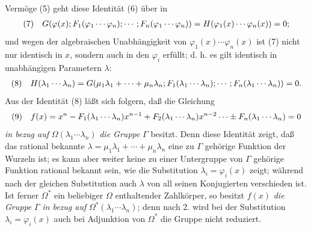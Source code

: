 Vermöge (5) geht diese Identität (6) über in
\[
\begin{array}{@{}l@{\quad}l@{}}
(7)& \displaystyle G(\varphi(x);F_1(\varphi_1\cdots\varphi_n);\cdots;F_n(\varphi_1\cdots\varphi_n)) =H(\varphi_1(x)\cdots\varphi_n(x))=0;
\end{array}
\]
und wegen der algebraischen Unabhängigkeit von $\varphi_1(x)\cdots\varphi_n(x)$ ist (7) nicht nur identisch in $x$, sondern auch in den $\varphi_i$ erfüllt; d. h. es gilt identisch in unabhängigen Parametern $\lambda$:
\[
\begin{array}{@{}l@{\quad}l@{}}
(8)& \displaystyle H(\lambda_1\cdots\lambda_n)=G(\mu_1\lambda_1+\cdots+\mu_n\lambda_n;F_1(\lambda_1\cdots\lambda_n);\cdots;F_n(\lambda_1\cdots\lambda_n))=0.
\end{array}
\]
Aus der Identität (8) läßt sich folgern, daß die Gleichung
\[
\begin{array}{@{}l@{\quad}l@{}}
(9)& \displaystyle f(x)=x^n-F_1(\lambda_1\cdots\lambda_n)x^{n-1}+F_2(\lambda_1\cdots\lambda_n)x^{n-2}\cdots\pm F_n(\lambda_1\cdots\lambda_n)=0
\end{array}
\]
\emph{in bezug auf} $\Omega(\lambda_1\cdots\lambda_n)$ \emph{die Gruppe} $\Gamma$ besitzt. Denn diese Identität zeigt, daß das rational bekannte $\lambda=\mu_1\lambda_1+\cdots+\mu_n\lambda_n$ eine zu $\Gamma$ gehörige Funktion der Wurzeln ist; es kann aber weiter keine zu einer Untergruppe von $\Gamma$ gehörige Funktion rational bekannt sein, wie die Substitution $\lambda_i=\varphi_i(x)$ zeigt; während nach der gleichen Substitution auch $\lambda$ von all seinen Konjugierten verschieden ist. Ist ferner $\Omega^*$ ein beliebiger $\Omega$ enthaltender Zahlkörper, so besitzt $f(x)$ \emph{die Gruppe} $\Gamma$ \emph{in bezug auf} $\Omega^*(\lambda_1\cdots\lambda_n)$; denn nach 2. wird bei der Substitution $\lambda_i=\varphi_i(x)$ auch bei Adjunktion von $\Omega^*$ die Gruppe nicht reduziert.

